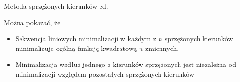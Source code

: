 \begin{frame}{Metoda sprzężonych kierunków cd.}
    
 	\begin{block}{Można pokazać, że}
 	\begin{itemize}
 	    \item   Sekwencja liniowych minimalizacji w każdym z $n$ sprzężonych kierunków minimalizuje ogólną funkcję kwadratową $n$ zmiennych.
 	    \item Minimalizacja wzdłuż jednego z kierunków sprzężonych jest niezależna od minimalizacji  względem pozostałych sprzężonych kierunków
 	\end{itemize}
 	\end{block}







\end{frame}
